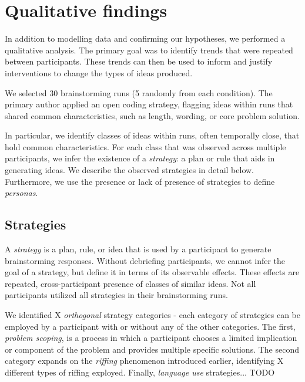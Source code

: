 \section{Qualitative findings}

In addition to modelling data and confirming our hypotheses, we performed a qualitative analysis. The primary goal was to identify trends  that were repeated between participants. These trends can then be used to inform and justify interventions to change the types of ideas produced.

We selected 30 brainstorming runs (5 randomly from each condition). The primary author applied an open coding strategy, flagging ideas within runs that shared common characteristics, such as length, wording, or core problem solution.

In particular, we identify classes of ideas within runs, often temporally close, that hold common characteristics. For each class that was observed across multiple participants, we infer the existence of a \emph{strategy}: a plan or rule that aids in generating ideas. We describe the observed strategies in detail below.
Furthermore, we use the presence or lack of presence of strategies to define \emph{personas}.

\subsection{Strategies}

A \emph{strategy} is a plan, rule, or idea that is used by a participant to generate brainstorming responses.
Without debriefing participants, we cannot infer the goal of a strategy, but define it in terms of its observable effects.
These effects are repeated, cross-participant presence of classes of similar ideas.
Not all participants utilized all strategies in their brainstorming runs.

We identified X \emph{orthogonal} strategy categories - each category of strategies can be employed by a participant with or without any of the other categories.
The first, \emph{problem scoping}, is a process in which a participant chooses a limited implication or component of the problem and provides multiple specific solutions.
The second category expands on the \emph{riffing} phenomenon introduced earlier, identifying X different types of riffing exployed.
Finally, \emph{language use} strategies... TODO

